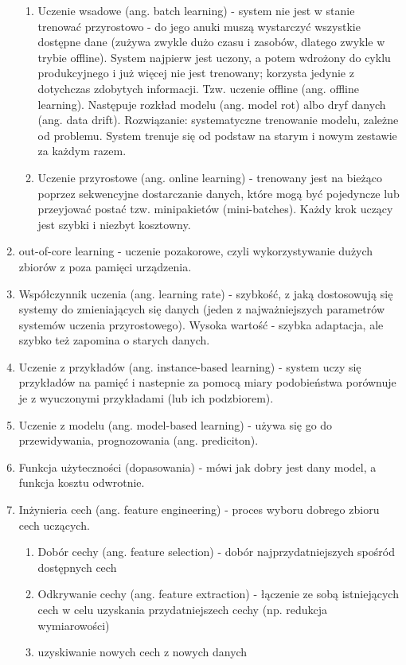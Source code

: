 \documentclass[polish,12pt,a4paper]{article}
\begin{document}
\begin{enumerate}
\begin{enumerate}
			\item Uczenie wsadowe (ang. batch learning) - system nie jest w stanie trenować przyrostowo - do jego anuki muszą wystarczyć wszystkie dostępne dane (zużywa zwykle dużo czasu i zasobów, dlatego zwykle w trybie offline). System najpierw jest uczony, a potem wdrożony do cyklu produkcyjnego i już więcej nie jest trenowany; korzysta jedynie z dotychczas zdobytych informacji. Tzw. uczenie offline (ang. offline learning).
			Następuje rozkład modelu (ang. model rot) albo dryf danych (ang. data drift). Rozwiązanie: systematyczne trenowanie modelu, zależne od problemu. System trenuje się od podstaw na starym i nowym zestawie za każdym razem.
			\item Uczenie przyrostowe (ang. online learning) - trenowany jest na bieżąco poprzez sekwencyjne dostarczanie danych, które mogą być pojedyncze lub przeyjować postać tzw. minipakietów (mini-batches). Każdy krok uczący jest szybki i niezbyt kosztowny.
		\end{enumerate}
		\item out-of-core learning - uczenie pozakorowe, czyli wykorzystywanie dużych zbiorów z poza pamięci urządzenia.
		\item Współczynnik uczenia (ang. learning rate) - szybkość, z jaką dostosowują się systemy do zmieniających się danych (jeden z najważniejszych parametrów systemów uczenia przyrostowego). Wysoka wartość - szybka adaptacja, ale szybko też zapomina o starych danych.
		\item Uczenie z przykładów (ang. instance-based learning) - system uczy się przykładów na pamięć i nastepnie za pomocą miary podobieństwa porównuje je z wyuczonymi przykładami (lub ich podzbiorem).
		\item Uczenie z modelu (ang. model-based learning) - używa się go do przewidywania, prognozowania (ang. prediciton).
		\item Funkcja użyteczności (dopasowania) - mówi jak dobry jest dany model, a funkcja kosztu odwrotnie.
		\item Inżynieria cech (ang. feature engineering) - proces wyboru dobrego zbioru cech uczących.
		\begin{enumerate}
			\item Dobór cechy (ang. feature selection) - dobór najprzydatniejszych spośród dostępnych cech
			\item Odkrywanie cechy (ang. feature extraction) - łączenie ze sobą istniejących cech w celu uzyskania przydatniejszech cechy (np. redukcja wymiarowości)
			\item uzyskiwanie nowych cech z nowych danych

\end{enumerate}
\end{enumerate}
\end{document}
